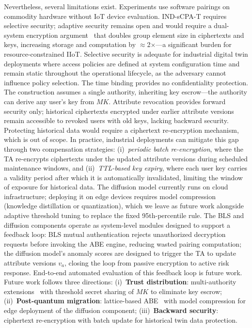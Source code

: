 ﻿\documentclass[lettersize,journal]{IEEEtran}
\begin{document}
Nevertheless, several limitations exist. Experiments use software
pairings on commodity hardware without IoT device evaluation. IND-sCPA-T
requires selective security; adaptive security remains open and would
require a dual-system encryption argument~\cite{Waters2011} that doubles
group element size in ciphertexts and keys, increasing storage and
computation by $\approx$2$\times$---a significant burden for resource-constrained
IIoT. Selective security is adequate for industrial digital twin deployments
where access policies are defined at system configuration time and remain
static throughout the operational lifecycle, as the adversary cannot influence
policy selection. The time
binding provides no confidentiality protection. The construction assumes
a single authority, inheriting key escrow---the authority can derive any
user's key from $MK$. Attribute revocation provides forward security only;
historical ciphertexts encrypted under earlier attribute versions remain
accessible to revoked users with old keys, lacking backward security.
Protecting historical data would require a ciphertext re-encryption
mechanism, which is out of scope. In practice, industrial deployments
can mitigate this gap through two compensation strategies:
(i)~\emph{periodic batch re-encryption}, where the TA re-encrypts
ciphertexts under the updated attribute versions during scheduled
maintenance windows, and (ii)~\emph{TTL-based key expiry}, where
each user key carries a validity period after which it is
automatically invalidated, limiting the window of exposure for
historical data. The diffusion model currently runs on
cloud infrastructure; deploying it on edge devices requires model
compression (knowledge distillation or quantization), which we leave as
future work alongside adaptive threshold tuning to replace the fixed
95th-percentile rule. The BLS and diffusion components operate as
system-level modules designed to support a feedback loop: BLS mutual
authentication rejects unauthorized decryption requests before invoking
the ABE engine, reducing wasted pairing computation; the diffusion
model's anomaly scores are designed to trigger the TA to update attribute
versions $v_a$, closing the loop from passive encryption to active risk
response. End-to-end automated evaluation of this feedback loop is
future work. Future work follows three directions:
(i)~\textbf{Trust distribution}: multi-authority
extensions~\cite{Datta2025_Decentralized, Zhang2026_MultiAuthority} with
threshold secret sharing of $MK$ to eliminate key escrow;
(ii)~\textbf{Post-quantum migration}: lattice-based
ABE~\cite{Gasparini2026_LatticeBenchmark} with model compression for
edge deployment of the diffusion component;
(iii)~\textbf{Backward security}: ciphertext re-encryption with batch
update for historical twin data protection.



\end{document}
